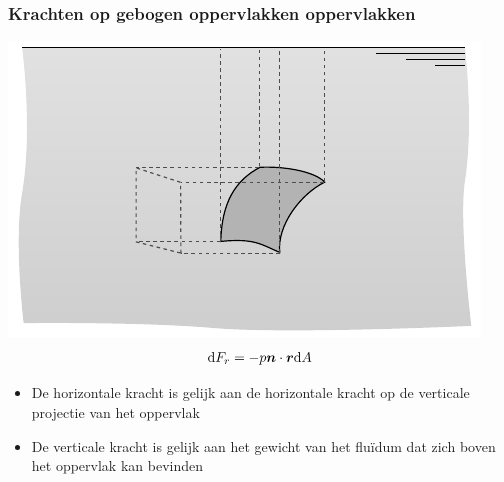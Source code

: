\documentclass[t]{beamer}
\begin{document}
  		\begin{frame}
			\frametitle{Krachten op gebogen oppervlakken oppervlakken}
			\center
			\includegraphics[scale=0.9]{../fig/hydrostatica/kracht_gebogen_oppervlak_vereenvoudigd_3d}
			\pause
			\vspace{-0.5cm}
			\begin{equation}
				\mathrm{d} F_r = -p \boldsymbol{n} \cdot \boldsymbol{r} \mathrm{d} A
			\end{equation}
			\vspace{-0.7cm}
			\begin{itemize}
				\pause
				\item De horizontale kracht is gelijk aan de horizontale kracht op de verticale projectie van het oppervlak
				\pause
				\item De verticale kracht is gelijk aan het gewicht van het fluïdum dat zich boven het oppervlak kan bevinden
			\end{itemize}
  		\end{frame}
\end{document}
